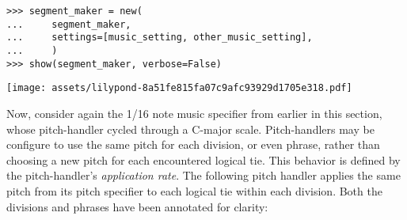 \begin{comment}
<abjad>[stylesheet=../consort.ily]
segment_maker = new(
    segment_maker,
    settings=[music_setting, other_music_setting],
    )
show(segment_maker, verbose=False)
</abjad>
\end{comment}

\begin{abjadbookoutput}
\begin{singlespacing}
\vspace{-0.5\baselineskip}
\begin{verbatim}
>>> segment_maker = new(
...     segment_maker,
...     settings=[music_setting, other_music_setting],
...     )
>>> show(segment_maker, verbose=False)
\end{verbatim}
\noindent\texttt{[image: assets/lilypond-8a51fe815fa07c9afc93929d1705e318.pdf]}
\end{singlespacing}
\end{abjadbookoutput}

\noindent Now, consider again the 1/16 note music specifier from earlier in
this section, whose pitch-handler cycled through a C-major scale.
Pitch-handlers may be configure to use the same pitch for each division, or
even phrase, rather than choosing a new pitch for each encountered logical tie.
This behavior is defined by the pitch-handler's \emph{application rate}. The
following pitch handler applies the same pitch from its pitch specifier to each
logical tie within each division. Both the divisions and phrases have been
annotated for clarity:

\begin{comment}
<abjad>[stylesheet=../consort.ily]
music_specifier = consort.MusicSpecifier(
    pitch_handler=consort.AbsolutePitchHandler(
        pitch_application_rate='division',
        pitch_specifier="c' d' e' f' g' a' b' c''",
        ),
    rhythm_maker=rhythmmakertools.EvenDivisionRhythmMaker(denominators=[16]),
    )
music_setting = consort.MusicSetting(
    timespan_maker=timespan_maker,
    v1=music_specifier,
    v2=music_specifier,
    )
segment_maker = new(segment_maker, settings=[music_setting])
lilypond_file, metadata = segment_maker(verbose=False)
consort.annotate(lilypond_file.score)
show(lilypond_file)
</abjad>
\end{comment}

